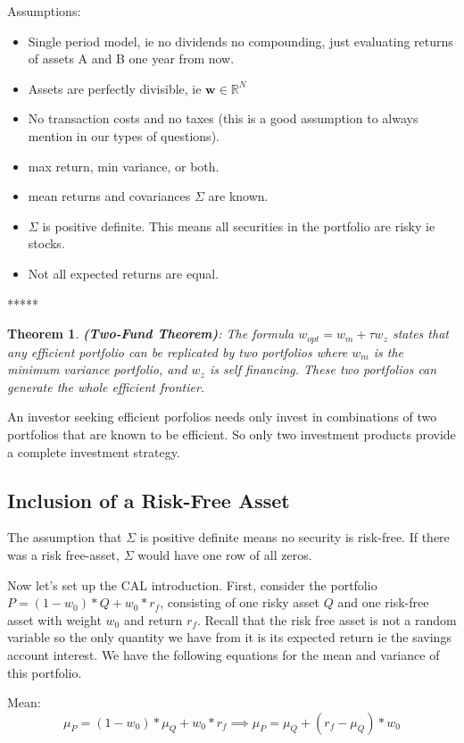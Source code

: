 \documentclass{article}
\newtheorem{theorem}{Theorem}
\begin{document}
Assumptions: 
\begin{itemize}
\item Single period model, ie no dividends no compounding, just evaluating returns of assets A and B one year from now. 
\item Assets are perfectly divisible, ie $\bm w \in \mathbb{R}^N$
\item No transaction costs and no taxes (this is a good assumption to always mention in our types of questions). 
\item max return, min variance, or both.
\item mean returns and covariances $\Sigma$ are known. 
\item $\Sigma$ is positive definite. This means all  securities in the portfolio are risky ie stocks.
\item Not all expected returns are equal.
\end{itemize}

***** 
\begin{theorem}
\textbf{(Two-Fund Theorem)}: The formula $w_{opt} = w_m + \tau w_z$ states that any efficient portfolio can be replicated by two portfolios where $w_m$ is the minimum variance portfolio, and $w_z$ is self financing. These two portfolios can generate the whole efficient frontier. 
\end{theorem}

An investor seeking efficient porfolios needs only invest in combinations of two portfolios that are known to be efficient. So only two investment products provide a complete investment strategy.

\subsection{Inclusion of a Risk-Free Asset}
The assumption that $\Sigma$ is positive definite means no security is risk-free. If there was a risk free-asset, $\Sigma$ would have one row of all zeros. 

Now let's set up the CAL introduction. First, consider the portfolio $P = (1-w_0)*Q + w_0*r_f$, consisting of one risky asset $Q$ and one risk-free asset with weight $w_0$ and return $r_f$. Recall that the risk free asset is not a random variable  so the only quantity we have from it is its expected return ie the savings account interest. 
We have the following equations for the mean and variance of this portfolio. 

Mean:
\[ 
\mu_P = (1-w_0)* \mu_Q + w_0*r_f 
\implies 
\mu_P = \mu_Q + (r_f - \mu_Q)*w_0 \]
\end{document}
